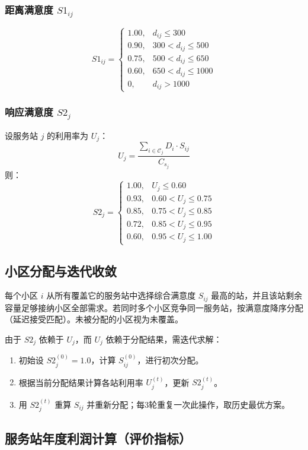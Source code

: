 \documentclass[12pt,a4paper]{article}
\begin{document}
\subsubsection{距离满意度 $S1_{ij}$}
\[
S1_{ij} = 
\begin{cases}
1.00, & d_{ij} \le 300 \\[2pt]
0.90, & 300 < d_{ij} \le 500 \\[2pt]
0.75, & 500 < d_{ij} \le 650 \\[2pt]
0.60, & 650 < d_{ij} \le 1000 \\[2pt]
0, & d_{ij} > 1000
\end{cases}
\]

\subsubsection{响应满意度 $S2_j$}
设服务站 $j$ 的利用率为 $U_j$：
\[
U_j = \frac{\displaystyle\sum_{i \in \mathcal{C}_j} D_i \cdot S_{ij}}{C_{s_j}}
\]
则：
\[
S2_j = 
\begin{cases}
1.00, & U_j \le 0.60 \\[2pt]
0.93, & 0.60 < U_j \le 0.75 \\[2pt]
0.85, & 0.75 < U_j \le 0.85 \\[2pt]
0.72, & 0.85 < U_j \le 0.95 \\[2pt]
0.60, & 0.95 < U_j \le 1.00
\end{cases}
\]

\subsection{小区分配与迭代收敛}
每个小区 $i$ 从所有覆盖它的服务站中选择综合满意度 $S_{ij}$ 最高的站，并且该站剩余容量足够接纳小区全部需求。若同时多个小区竞争同一服务站，按满意度降序分配（延迟接受匹配）。未被分配的小区视为未覆盖。

由于 $S2_j$ 依赖于 $U_j$，而 $U_j$ 依赖于分配结果，需迭代求解：
\begin{enumerate}[label=\arabic*., leftmargin=*]
\item 初始设 $S2_j^{(0)} = 1.0$，计算 $S_{ij}^{(0)}$，进行初次分配。
\item 根据当前分配结果计算各站利用率 $U_j^{(t)}$，更新 $S2_j^{(t)}$。
\item 用 $S2_j^{(t)}$ 重算 $S_{ij}$ 并重新分配；每3轮重复一次此操作，取历史最优方案。
\end{enumerate}

\subsection{服务站年度利润计算（评价指标）}
\end{document}
